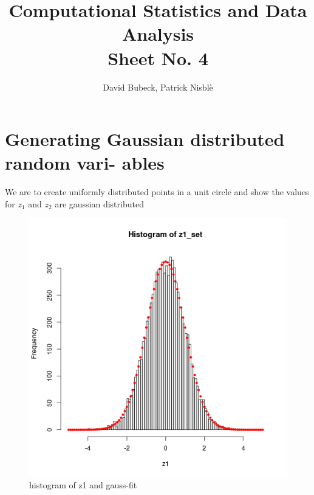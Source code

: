 \documentclass[11pt, a4paper, reqno]{scrartcl}
\begin{document}
    \title{Computational Statistics and Data Analysis\\Sheet No. 4}
    \author{David Bubeck, Patrick Nisbl\`e}
    \maketitle


    \section{Generating Gaussian distributed random vari-
        ables}
        We are to create uniformly distributed points in a unit circle and show the values for $z_1$ and $z_2$ are gaussian distributed
        
        
    
        \begin{figure}[H]
            \includegraphics[height=.5\paperheight6]{ex11.png}
            \caption{histogram of z1 and gauss-fit}
        \end{figure}
        
\end{document}
